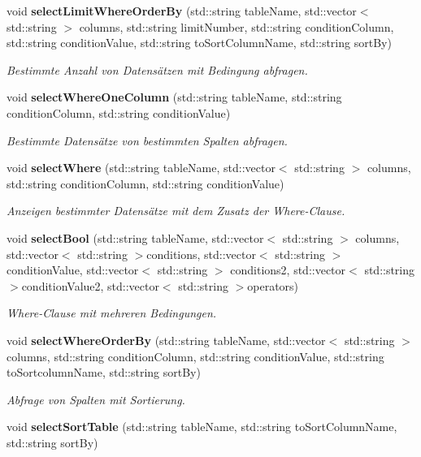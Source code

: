 \begin{DoxyCompactItemize}
void \textbf{ select\+Limit\+Where\+Order\+By} (std\+::string table\+Name, std\+::vector$<$ std\+::string $>$ columns, std\+::string limit\+Number, std\+::string condition\+Column, std\+::string condition\+Value, std\+::string to\+Sort\+Column\+Name, std\+::string sort\+By)
\begin{DoxyCompactList}\small\item\em Bestimmte Anzahl von Datensätzen mit Bedingung abfragen. \end{DoxyCompactList}\item 
void \textbf{ select\+Where\+One\+Column} (std\+::string table\+Name, std\+::string condition\+Column, std\+::string condition\+Value)
\begin{DoxyCompactList}\small\item\em Bestimmte Datensätze von bestimmten Spalten abfragen. \end{DoxyCompactList}\item 
void \textbf{ select\+Where} (std\+::string table\+Name, std\+::vector$<$ std\+::string $>$ columns, std\+::string condition\+Column, std\+::string condition\+Value)
\begin{DoxyCompactList}\small\item\em Anzeigen bestimmter Datensätze mit dem Zusatz der Where-\/\+Clause. \end{DoxyCompactList}\item 
void \textbf{ select\+Bool} (std\+::string table\+Name, std\+::vector$<$ std\+::string $>$ columns, std\+::vector$<$ std\+::string $>$conditions, std\+::vector$<$ std\+::string $>$condition\+Value, std\+::vector$<$ std\+::string $>$ conditions2, std\+::vector$<$ std\+::string $>$condition\+Value2, std\+::vector$<$ std\+::string $>$operators)
\begin{DoxyCompactList}\small\item\em Where-\/\+Clause mit mehreren Bedingungen. \end{DoxyCompactList}\item 
void \textbf{ select\+Where\+Order\+By} (std\+::string table\+Name, std\+::vector$<$ std\+::string $>$ columns, std\+::string condition\+Column, std\+::string condition\+Value, std\+::string to\+Sortcolumn\+Name, std\+::string sort\+By)
\begin{DoxyCompactList}\small\item\em Abfrage von Spalten mit Sortierung. \end{DoxyCompactList}\item 
void \textbf{ select\+Sort\+Table} (std\+::string table\+Name, std\+::string to\+Sort\+Column\+Name, std\+::string sort\+By)

\end{DoxyCompactItemize}
